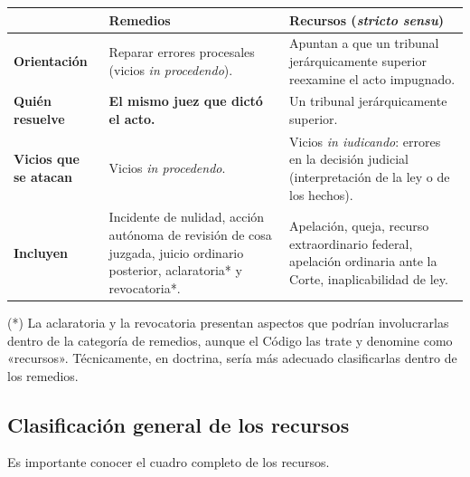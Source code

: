 \documentclass[12pt,oneside]{book}
\begin{document}
\begin{table}[H]
\centering
\small
\begin{tabularx}{\textwidth}{L{0.18\textwidth} >{\raggedright\arraybackslash}X >{\raggedright\arraybackslash}X}
\toprule
 & \textbf{Remedios} & \textbf{Recursos (\textit{stricto sensu})} \\
\midrule
\textbf{Orientación} &
Reparar errores procesales (vicios \textit{in procedendo}). &
Apuntan a que un tribunal jerárquicamente superior reexamine el acto impugnado. \\
\midrule
\textbf{Quién resuelve} &
\textbf{El mismo juez que dictó el acto.} &
Un tribunal jerárquicamente superior. \\
\midrule
\textbf{Vicios que se atacan} &
Vicios \textit{in procedendo}. &
Vicios \textit{in iudicando}: errores en la decisión judicial (interpretación de la ley o de los hechos). \\
\midrule
\textbf{Incluyen} &
Incidente de nulidad, acción autónoma de revisión de cosa juzgada, juicio ordinario posterior, aclaratoria* y revocatoria*. &
Apelación, queja, recurso extraordinario federal, apelación ordinaria ante la Corte, inaplicabilidad de ley. \\
\bottomrule
\end{tabularx}
\end{table}

(*) La aclaratoria y la revocatoria presentan aspectos que podrían involucrarlas dentro de la categoría de remedios, aunque el Código las trate y denomine como «recursos». Técnicamente, en doctrina, sería más adecuado clasificarlas dentro de los remedios.

\subsection{Clasificaci\'on general de los recursos}

Es importante conocer el cuadro completo de los recursos.
\end{document}
